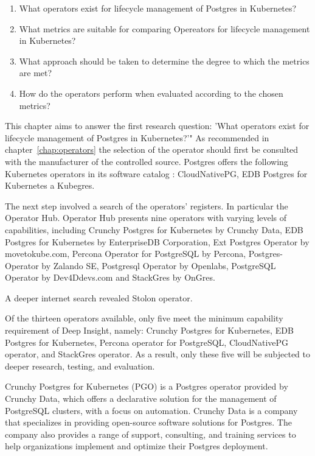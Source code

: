 \begin{enumerate}
    \item What operators exist for lifecycle management of Postgres in Kubernetes?
    \item What metrics are suitable for comparing Opereators for lifecycle management in Kubernetes?
    \item What approach should be taken to determine the degree to which the metrics are met?
    \item How do the operators perform when evaluated according to the chosen metrics?
\end{enumerate}

\label{chap:searchForoperators}
This chapter aims to answer the first research question: 'What operators exist for lifecycle management of Postgres in Kubernetes?'"
As recommended in chapter~\ref{chap:operators} the selection of the operator should first be consulted with the manufacturer of the controlled source. Postgres offers the following Kubernetes operators in its software catalog \cite{docuPgSwCatalogue}: CloudNativePG, EDB Postgres for Kubernetes a Kubegres.

The next step involved a search of the operators' registers. In particular the Operator Hub. \cite{operatorHubPGSearch} Operator Hub presents nine operators with varying levels of capabilities, including Crunchy Postgres for Kubernetes by Crunchy Data, EDB Postgres for Kubernetes by EnterpriseDB Corporation, Ext Postgres Operator by movetokube.com, Percona Operator for PostgreSQL by Percona, Postgres-Operator by Zalando SE, Postgresql Operator by Openlabs, PostgreSQL Operator by Dev4Ddevs.com and StackGres by OnGres.

A deeper internet search revealed Stolon operator. \cite{PalarkComparingKubernetes}

Of the thirteen operators available, only five meet the minimum capability requirement of Deep Insight, namely: Crunchy Postgres for Kubernetes, EDB Postgres for Kubernetes, Percona operator for PostgreSQL, CloudNativePG operator, and StackGres operator. As a result, only these five will be subjected to deeper research, testing, and evaluation.

\pagebreak
{}
Crunchy Postgres for Kubernetes (PGO) is a Postgres operator provided by Crunchy Data, which offers a declarative solution for the management of PostgreSQL clusters, with a focus on automation.
Crunchy Data is a company that specializes in providing open-source software solutions for Postgres. The company also provides a range of support, consulting, and training services to help organizations implement and optimize their Postgres deployment. \cite{Crunchy}

